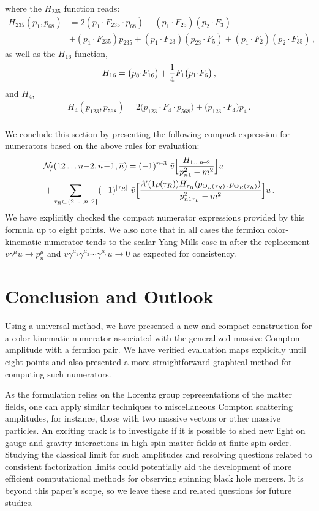 \documentclass[a4paper,12pt]{article}
\makeatletter
\def\sc#1{\overline{#1}}
\def\nn{\nonumber}
\newcommand{\npre}{\mathcal{N}}
\newcommand{\mdot}{{\cdot}}
\newcommand*{\bigcdot}{}%
\DeclareRobustCommand*{\bigcdot}{%
  \mathbin{\mathpalette\bigcdot@{}}%
}
\newcommand*{\bigcdot@scalefactor}{.6}
\newcommand*{\bigcdot@widthfactor}{1.25}
\newcommand*{\bigcdot@}[2]{%
  \sbox0{$#1\vcenter{}$}%
  \sbox2{$#1\cdot\m@th$}%
  \hbox to \bigcdot@widthfactor\wd2{%
    \hfil
    \raise\ht0\hbox{%
      \scalebox{\bigcdot@scalefactor}{%
        \lower\ht0\hbox{$#1\bullet\m@th$}%
      }%
    }%
    \hfil
  }%
}
\newcommand{\dd}{\bigcdot}
\makeatother
\begin{document}
%
where the $H_{235}$ function reads:  
%
\begin{align}
    H_{235}(p_1,p_{68})&=2(p_{1}\mdot F_{235}\mdot p_{68})+(p_{1}\mdot F_{25})\dd (p_{2}\mdot F_{3})\nn\\
    &+(p_{1}\mdot F_{235})\dd p_{235}
+(p_{1}\mdot F_{23})\dd (p_{23}\mdot F_{5})+(p_{1}\mdot F_{2})\dd (p_{2}\mdot F_{35}) \, ,
\end{align}
%
as well as the $H_{16}$ function,
%
\begin{align}
    H_{16}= \big(p_8\mdot F_{16}\big) + {1\over 4}F_1\dd \big(p_1 \mdot F_{6}\big) \, ,
\end{align}
%
and $H_{4}$,
%
\begin{align}
   H_{4}(p_{123},p_{568}) =2 \big(p_{123}\mdot F_{4}\mdot p_{568}\big)+
 \big(p_{123}\mdot  F_{4}\big)\dd p_{4} \, .
\end{align}\\[5pt]
%
We conclude this section by presenting the following compact expression for numerators based on the above rules for evaluation: 
%
\begin{align}\label{eq:recJ}
   & \npre_{\!f}(12\ldots n{-}2, \sc {n\!-\!1}, \sc {n})=(-1)^{n\!-\!3} \ \bar v \dd\Big[ { H_{1\ldots n\!-\!2}\over p_{n1}^2-m^2} \Big]\dd u \nn\\
   &+\sum_{\tau_R\subset \{2,\ldots,n\!-\!2\}}(-1)^{|\tau_R|} \ \bar v \dd \Big[
   {{\cal X}(1\rho(\tau_R))\dd  H_{\tau_R}(p_{\Theta_L(\tau_R)},p_{\Theta_R(\tau_R)})\over p^2_{n1\tau_L}-m^2}\Big]\dd u \,.
\end{align} 
%
We have explicitly checked the compact numerator expressions provided by this formula up to eight points. We also note that in all cases the fermion color-kinematic numerator tends to the scalar Yang-Mills case in \cite{Chen:2022nei} after the replacement $\bar v\gamma^\mu u\to p_n^\mu$ and $\bar v\gamma^{\mu_1}\gamma^{\mu_2}\cdots \gamma^{\mu_r} u\to 0$ as expected for consistency.
%
\section{Conclusion and Outlook}
Using a universal method, we have presented a new and compact construction for a color-kinematic numerator associated with the generalized massive Compton amplitude with a fermion pair. We have verified evaluation maps explicitly until eight points and also presented a more straightforward graphical method for computing such numerators.

As the formulation relies on the Lorentz group representations of the matter fields, one can apply similar techniques to miscellaneous Compton scattering amplitudes, for instance, those with two massive vectors or other massive particles. An exciting track is to investigate if it is possible to shed new light on gauge and gravity interactions in high-spin matter fields at finite spin order. Studying the classical limit for such amplitudes and resolving questions related to consistent factorization limits could potentially aid the development of more efficient computational methods for observing spinning black hole mergers. It is beyond this paper's scope, so we leave these and related questions for future studies.
\end{document}
